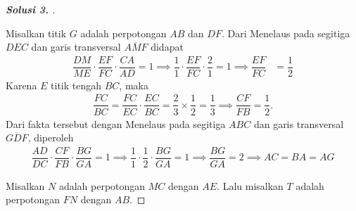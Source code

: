 \documentclass[letterpaper, 13pt]{scrartcl}
\begin{document}
\begin{proof}[\textbf{Solusi 3. }]
\begin{center}
\end{center}

    Misalkan titik $G$ adalah perpotongan $AB$ dan $DF$.
    Dari Menelaus pada segitiga $DEC$ dan garis transversal $\overline{AMF}$ didapat
    \begin{align*}
        \dfrac{DM}{ME}\cdot \dfrac{EF}{FC} \cdot \dfrac{CA}{AD} = 1 \implies
        \dfrac{1}{1}\cdot \dfrac{EF}{FC} \cdot \dfrac{2}{1} = 1 \implies
        \dfrac{EF}{FC} &= \dfrac{1}{2}
    \end{align*}
    Karena $E$ titik tengah $BC$, maka
    \begin{align*}
        \dfrac{FC}{BC} = \dfrac{FC}{EC} \cdot \dfrac{EC}{BC} = \dfrac{2}{3} \times \dfrac{1}{2} = \dfrac{1}{3} \implies \dfrac{CF}{FB} = \dfrac{1}{2}.
    \end{align*}
    Dari fakta tersebut dengan Menelaus pada segitiga $ABC$ dan garis transversal $\overline{GDF}$, diperoleh
    \begin{align*}
        \dfrac{AD}{DC} \cdot \dfrac{CF}{FB} \cdot \dfrac{BG}{GA} = 1 \implies
        \dfrac{1}{1} \cdot \dfrac{1}{2} \cdot \dfrac{BG}{GA} = 1 \implies
        \dfrac{BG}{GA} = 2 \implies
        AC = BA = AG
    \end{align*}

    Misalkan $N$ adalah perpotongan $MC$ dengan $AE$. Lalu misalkan $T$ adalah perpotongan $FN$ dengan $AB$.


\end{proof}
\end{document}

